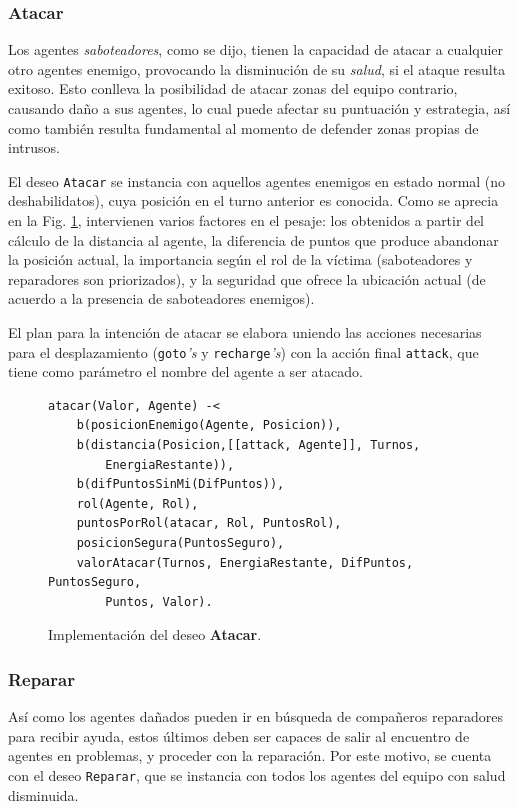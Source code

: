 \documentclass[oneside]{book}
\theoremstyle{definition}
\theoremstyle{example}
\begin{document}
\subsubsection{Atacar}

Los agentes \textit{saboteadores}, como se dijo, tienen la capacidad de atacar a cualquier otro 
agentes enemigo, provocando la disminución de su \textit{salud}, si el ataque resulta exitoso.
Esto conlleva la posibilidad de atacar zonas del equipo contrario, causando daño a sus agentes, 
lo cual puede afectar su puntuación y estrategia, así como también resulta fundamental 
al momento de defender zonas propias de intrusos.

El deseo \texttt{Atacar} se instancia con aquellos agentes enemigos en estado normal (no deshabilidatos),
cuya posición en el turno anterior es conocida. Como se aprecia en la Fig. \ref{fig:deseoAtacar}, 
intervienen varios factores en el pesaje: los obtenidos a partir del cálculo de la distancia al 
agente, la diferencia de puntos que produce abandonar la posición actual, la importancia según el 
rol de la víctima (saboteadores y reparadores son priorizados), y la seguridad que ofrece la ubicación
actual (de acuerdo a la presencia de saboteadores enemigos). 

El plan para la intención de atacar se elabora uniendo las acciones necesarias para el desplazamiento
(\texttt{goto}\textit{'s} y \texttt{recharge}\textit{'s}) con la acción final \texttt{attack}, que 
tiene como parámetro el nombre del agente a ser atacado.

\begin{figure}
\begin{verbatim}
atacar(Valor, Agente) -<
    b(posicionEnemigo(Agente, Posicion)),
    b(distancia(Posicion,[[attack, Agente]], Turnos, 
    	EnergiaRestante)),
	b(difPuntosSinMi(DifPuntos)),
    rol(Agente, Rol),
	puntosPorRol(atacar, Rol, PuntosRol),
	posicionSegura(PuntosSeguro),
	valorAtacar(Turnos, EnergiaRestante, DifPuntos, PuntosSeguro, 
		Puntos, Valor).
\end{verbatim}
\caption{Implementación del deseo \textbf{Atacar}.}
\label{fig:deseoAtacar}
\end{figure}

\subsubsection{Reparar}

Así como los agentes dañados pueden ir en búsqueda de compañeros reparadores para recibir ayuda,
estos últimos deben ser capaces de salir al encuentro de agentes en problemas, y proceder con la 
reparación. Por este motivo, se cuenta con el deseo \texttt{Reparar}, que se instancia con todos 
los agentes del equipo con salud disminuida.
\end{document}
